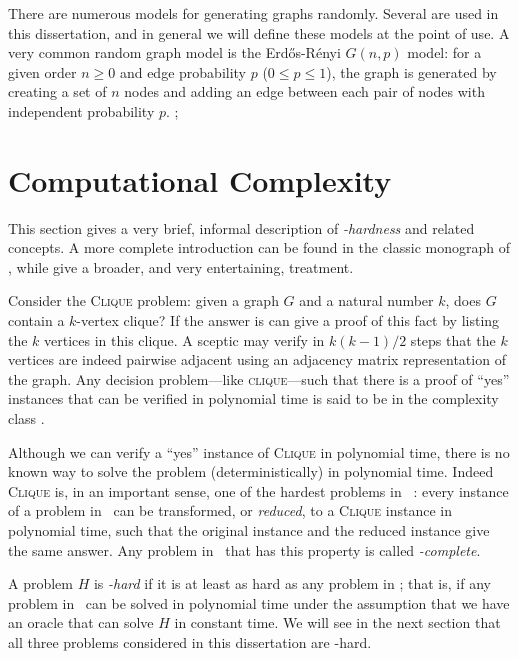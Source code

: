 There are numerous models for generating graphs randomly. Several are used
in this dissertation, and in general we will define these models at the point
of use.  A very common random graph model is the Erd\H{o}s-Rényi $G(n,p)$
model: for a given order $n \geq 0$ and edge probability $p$ ($0 \leq p \leq 1$),
the graph is generated by creating a set of $n$ nodes and adding an edge
between each pair of nodes with independent probability $p$.
 \citet{gilbert1959random}; 
\citet{erdos1960on}  \citet{moore2011nature} 

\section{Computational Complexity}\label{sec:complexity}

This section gives a very brief, informal description of
\emph{\NP-hardness} and related concepts. A more complete introduction can be
found in the classic monograph of \citet{DBLP:books/fm/GareyJ79},
while \citet{moore2011nature} give a broader, and very entertaining,
treatment.

Consider the \textsc{Clique} problem: given a graph $G$ and a natural number $k$,
does $G$ contain a $k$-vertex clique?  If the answer is 
 can give a proof
of this fact by listing the $k$ vertices in this clique.  A sceptic may verify
in $k(k-1)/2$ steps that the $k$ vertices are indeed pairwise adjacent
using an adjacency matrix representation of the graph.  Any decision
problem---like \textsc{clique}---such that there is a proof of ``yes'' instances
that can be verified in polynomial time is said to be in the complexity class \NP.

Although we can verify a ``yes'' instance of \textsc{Clique} in polynomial
time, there is no known way to solve the problem (deterministically) in polynomial time.
Indeed \textsc{Clique} is, in an important sense, one of the hardest problems in \NP\
\citep{DBLP:conf/coco/Karp72}: every instance of a problem in \NP\ can be
transformed, or \emph{reduced}, to a \textsc{Clique} instance in polynomial
time, such that the original instance and the reduced instance give the same
answer.  Any problem in \NP\ that has this property is called \emph{\NP-complete}.

A problem $H$ is \emph{\NP-hard} if it is at least as hard as any problem in \NP;
that is, if any problem in \NP\ can be solved in polynomial time under the assumption
that we have an oracle that can solve $H$ in constant time.  We will see in the next
section that all three problems considered in this dissertation are \NP-hard.

